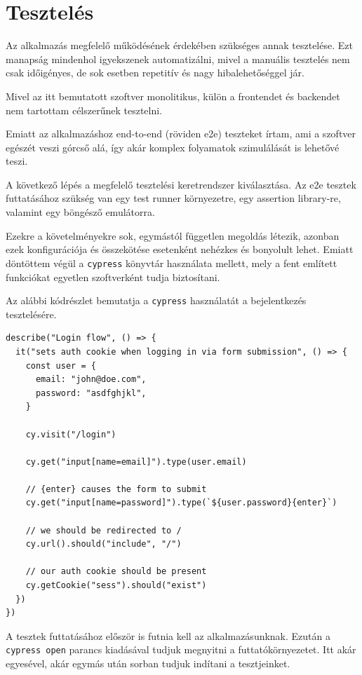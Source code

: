 \chapter{Tesztelés}

Az alkalmazás megfelelő működésének érdekében szükséges annak tesztelése.
Ezt manapság mindenhol igyekszenek automatizálni, mivel a manuális tesztelés nem csak időigényes, de sok esetben
repetitív és nagy hibalehetőséggel jár.

Mivel az itt bemutatott szoftver monolitikus, külön a frontendet és backendet nem tartottam célszerűnek tesztelni.

Emiatt az alkalmazáshoz end-to-end (röviden e2e) teszteket írtam, ami a szoftver egészét veszi górcső alá, így akár komplex folyamatok
szimulálását is lehetővé teszi.

A következő lépés a megfelelő tesztelési keretrendszer kiválasztása. Az e2e tesztek futtatásához szükség van egy test runner környezetre, egy assertion library-re, valamint egy böngésző emulátorra.

Ezekre a követelményekre sok, egymástól független megoldás létezik, azonban ezek konfigurációja és összekötése esetenként nehézkes és bonyolult lehet.
Emiatt döntöttem végül a \lstinline|cypress|\cite{Cypress} könyvtár használata mellett, mely a fent említett funkciókat egyetlen szoftverként
tudja biztosítani.

Az alábbi kódrészlet bemutatja a \lstinline|cypress| használatát a bejelentkezés tesztelésére.

\begin{lstlisting}[caption=Bejelentkezés tesztelése]
describe("Login flow", () => {
  it("sets auth cookie when logging in via form submission", () => {
    const user = {
      email: "john@doe.com",
      password: "asdfghjkl",
    }

    cy.visit("/login")

    cy.get("input[name=email]").type(user.email)

    // {enter} causes the form to submit
    cy.get("input[name=password]").type(`${user.password}{enter}`)

    // we should be redirected to /
    cy.url().should("include", "/")

    // our auth cookie should be present
    cy.getCookie("sess").should("exist")
  })
})
\end{lstlisting}

A tesztek futtatásához először is futnia kell az alkalmazásunknak. Ezután a \lstinline|cypress open| parancs kiadásával
tudjuk megnyitni a futtatókörnyezetet. Itt akár egyesével, akár egymás után sorban tudjuk indítani a tesztjeinket.

